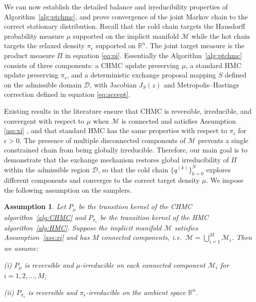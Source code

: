 \documentclass[12pt]{article}
\newtheorem{assumption}{Assumption}[section]
\begin{document}
We can now establish the detailed balance and irreducibility properties
of Algorithm~\ref{alg:ptchmc}, and prove convergence of the joint
Markov chain to the correct stationary distribution.
Recall that the cold chain targets the Hausdorff probability measure
$\mu$ supported on the implicit manifold
$\mathcal{M}$
while the hot chain targets the relaxed density $\pi_\epsilon$ supported on $\mathbb R^n$.
The joint target measure 
is  the product measure $\Pi$ in equation \eqref{eq:pi}.
Essentially the Algorithm~\ref{alg:ptchmc} consists of three components: a CHMC update preserving $\mu$, a standard HMC update preserving $\pi_\epsilon$, and a deterministic exchange proposal
mapping $S$ defined on the admissible domain $\mathcal D$,
with Jacobian $J_S(z)$ and
Metropolis--Hastings correction defined in equation \eqref{eq:accept}.

Existing results in the literature ensure that
CHMC is reversible, irreducible, and convergent
with respect to $\mu$ when $\mathcal M$ is connected and satisfies Assumption \ref{ass:xi} \citep{M3},
and that standard HMC has the same properties with respect
to $\pi_\epsilon$ for $\epsilon>0$.
The presence of multiple disconnected components of $\mathcal{M}$ prevents a single constrained chain from being globally irreducible. Therefore, our main goal is to demonstrate that the exchange mechanism restores global irreducibility of $\Pi$ within the admissible region $\mathcal{D}$, so that the cold chain $\{q^{(k)}\}_{k=0}^N$ explores different components and converges to the correct target density $\mu$. We impose the following assumption on the samplers.

\begin{assumption}\label{assm:samplers}
Let $P_\mu$ be the transition kernel of the CHMC algorithm~\ref{alg:CHMC} and $P_{\pi_\epsilon}$ be the transition kernel of the HMC algorithm~\ref{alg:HMC}. Suppose the implicit manifold $\mathcal{M}$ satisfies Assumption~\ref{ass:xi} and has $M$ connected components, i.e.\ $\mathcal{M} = \bigcup_{i=1}^{M} \mathcal{M}_i$. Then we assume:

(i) $P_\mu$ is reversible and $\mu$-irreducible on each connected component $\mathcal{M}_i$ for $i = 1, 2, \ldots, M$;

(ii) $P_{\pi_\epsilon}$ is reversible and $\pi_\epsilon$-irreducible on the ambient space $\mathbb{R}^n$.

\end{assumption}
\end{document}
